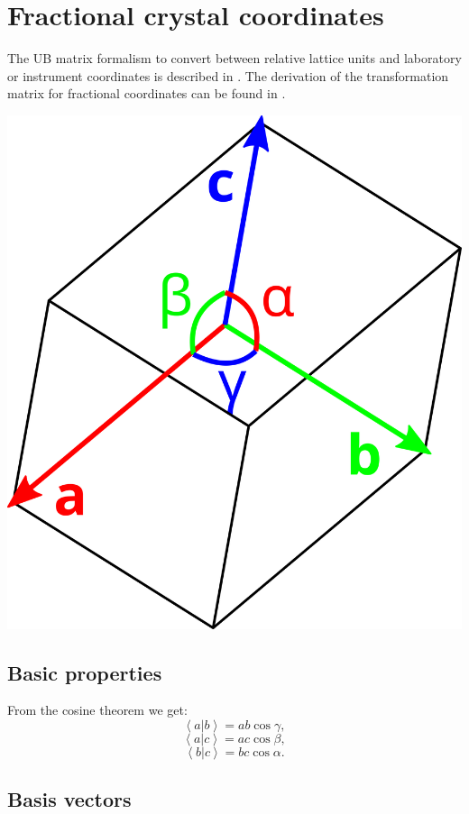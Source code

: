 %
%


\section{Fractional crystal coordinates}

The UB matrix formalism to convert between relative lattice units and laboratory or instrument coordinates is described in \cite{Lumsden2005}. The derivation of the transformation matrix for fractional coordinates can be found in \cite{wiki_fractional}.


\begin{center}
	\includegraphics[width = 0.2 \textwidth]{figures/cell}
\end{center}

\subsection*{Basic properties}

From the cosine theorem we get:
\begin{equation} \left< a | b \right > = ab \cos \gamma, \label{ab} \end{equation}
\begin{equation} \left< a | c \right > = ac \cos \beta, \label{ac} \end{equation}
\begin{equation} \left< b | c \right > = bc \cos \alpha. \label{bc} \end{equation}



\subsection*{Basis vectors}

